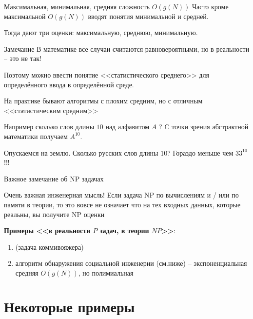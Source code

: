 \begin{frame}{Максимальная, минимальная, средняя сложность $O(g(N))$}
	\footnotesize
	Часто кроме максимальной $O(g(N))$ вводят понятия минимальной и средней.
	
	Тогда дают три оценки: максимальную, среднюю, минимальную.
	
	\begin{block}{Замечание}
		В математике все случаи считаются равновероятными,
		но в реальности -- это не так! 
		
		Поэтому можно ввести понятие <<статистического среднего>> для определённого ввода в определённой среде.
		
		На практике бывают алгоритмы с плохим средним, но с отличным <<статистическим средним>>
	\end{block}

	Например сколько слов длины $10$ над алфавитом $A$ ?
	C точки зрения абстрактной математики получаем $A^{10}$.
	
	Опускаемся на землю.
	Сколько русских слов длины $10$? Гораздо меньше чем $33^{10}$!!!
	
\end{frame}

\begin{frame}{Важное замечание об NP задачах}
	
	\begin{block}{Очень важная инженерная мысль!}
		Если задача NP по вычислениям и / или по памяти в теории,
		то это вовсе не означает что на тех входных данных, которые реальны,
		вы получите NP оценки
	\end{block}
	
	\textbf{Примеры <<в реальности $P$ задач, в теории $NP$>>}:
	\begin{enumerate}
		\item {} (задача коммивояжера) 
		\item алгоритм обнаружения социальной инженерии (см.ниже) -- экспоненциальная средняя $O(g(N))$, но полимиальная 
	\end{enumerate}
	
	
	
\end{frame}

\section{Некоторые примеры}\label{section:examples_1}

